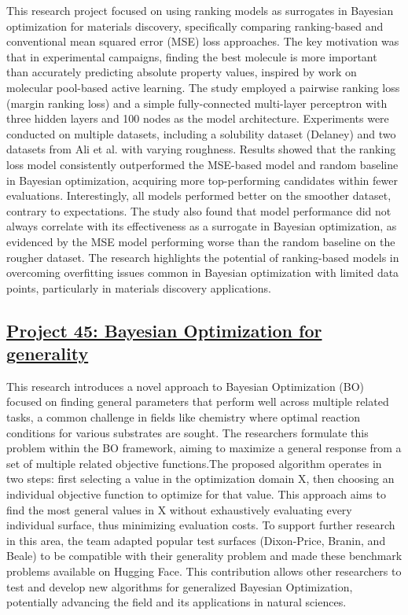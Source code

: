 This research project focused on using ranking models as surrogates in Bayesian optimization for materials discovery, specifically comparing ranking-based and conventional mean squared error (MSE) loss approaches. The key motivation was that in experimental campaigns, finding the best molecule is more important than accurately predicting absolute property values, inspired by work on molecular pool-based active learning\cite{graff_accelerating_2021}. The study employed a pairwise ranking loss (margin ranking loss) and a simple fully-connected multi-layer perceptron with three hidden layers and 100 nodes as the model architecture. Experiments were conducted on multiple datasets, including a solubility dataset (Delaney) and two datasets from Ali et al. with varying roughness\cite{aldeghi_roughness_2022}. Results showed that the ranking loss model consistently outperformed the MSE-based model and random baseline in Bayesian optimization, acquiring more top-performing candidates within fewer evaluations. Interestingly, all models performed better on the smoother dataset, contrary to expectations. The study also found that model performance did not always correlate with its effectiveness as a surrogate in Bayesian optimization, as evidenced by the MSE model performing worse than the random baseline on the rougher dataset. The research highlights the potential of ranking-based models in overcoming overfitting issues common in Bayesian optimization with limited data points, particularly in materials discovery applications.
 \subsection*{\href{https://www.youtube.com/watch?v=wfSyIudptfc}{Project 45: Bayesian Optimization for generality}}

This research introduces a novel approach to Bayesian Optimization (BO) focused on finding general parameters that perform well across multiple related tasks, a common challenge in fields like chemistry where optimal reaction conditions for various substrates are sought. The researchers formulate this problem within the BO framework, aiming to maximize a general response from a set of multiple related objective functions.The proposed algorithm operates in two steps: first selecting a value in the optimization domain X, then choosing an individual objective function to optimize for that value. This approach aims to find the most general values in X without exhaustively evaluating every individual surface, thus minimizing evaluation costs. To support further research in this area, the team adapted popular test surfaces (Dixon-Price, Branin, and Beale) to be compatible with their generality problem and made these benchmark problems available on Hugging Face. This contribution allows other researchers to test and develop new algorithms for generalized Bayesian Optimization, potentially advancing the field and its applications in natural sciences.

